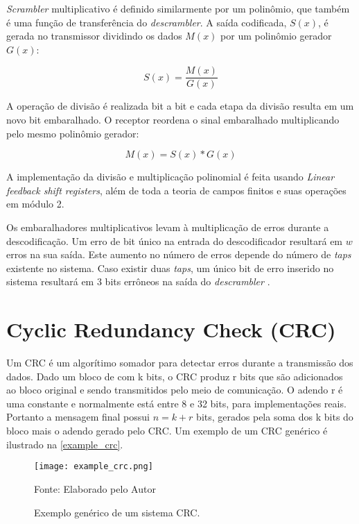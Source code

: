 \textit{Scrambler} multiplicativo é definido similarmente por um polinômio, que também é uma função de transferência do \textit{descrambler}. A saída codificada, $S(x)$, é gerada no transmissor dividindo os dados $M(x)$ por um polinômio gerador $G(x)$:

$$S(x) = \dfrac{M(x)}{G(x)}$$

A operação de divisão é realizada bit a bit e cada etapa da divisão resulta em um novo bit embaralhado. O receptor reordena o sinal embaralhado multiplicando pelo mesmo polinômio gerador:

$$M(x) = S(x)*G(x)$$

A implementação da divisão e multiplicação polinomial é feita usando \textit{Linear feedback shift registers}, além de toda a teoria de campos finitos e suas operações em módulo 2. 

Os embaralhadores multiplicativos levam à multiplicação de erros durante a descodificação. Um erro de bit único na entrada do descodificador resultará em $w$ erros na sua saída. Este aumento no número de erros depende do número de \textit{taps} existente no sistema. Caso existir duas \textit{taps}, um único bit de erro inserido no sistema resultará em 3 bits errôneos na saída do \textit{descrambler} \cite{Ghassan2018}. 

\chapter[CRC]{Cyclic Redundancy Check (CRC)} \label{crc:teoria}

Um CRC é um algorítimo somador para detectar erros durante a transmissão dos dados. Dado um bloco de com k bits, o CRC produz r bits que são adicionados ao bloco original e sendo transmitidos pelo meio de comunicação. O adendo r é uma constante e normalmente está entre 8 e 32 bits, para implementações reais. Portanto a mensagem final possui $n = k + r$ bits, gerados pela soma dos k bits do bloco mais o adendo gerado pelo CRC. Um exemplo de um CRC genérico é ilustrado na \autoref{example_crc}.

\begin{figure}[H]
	\caption{\label{example_crc}Exemplo genérico de um sistema CRC.}
	\centering
	\texttt{[image: example\_crc.png]}
	\begin{center}
		Fonte: Elaborado pelo Autor
	\end{center}	

\end{figure}

